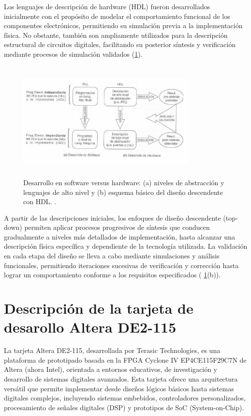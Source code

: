 Los lenguajes de descripción de hardware (HDL) fueron desarrollados inicialmente con el propósito de modelar el comportamiento funcional de los componentes electrónicos, permitiendo su simulación previa a la implementación física. No obstante, también son ampliamente utilizados para la descripción estructural de circuitos digitales, facilitando su posterior síntesis y verificación mediante procesos de simulación validados (\ref{fig:imagen2}).
\begin{figure}[h!] %
    \centering %
     \includegraphics[width=0.8\textwidth, height=6cm]{imagenes/img2} %
    \caption{Desarrollo en software versus hardware: (a) niveles de abstracción y lenguajes de alto nivel y (b) esquema básico del diseño descendente con HDL.  .}
    \label{fig:imagen2} %
\end{figure} 

A partir de las descripciones iniciales, los enfoques de diseño descendente (top-down) permiten aplicar procesos progresivos de síntesis que conducen gradualmente a niveles más detallados de implementación, hasta alcanzar una descripción física específica y dependiente de la tecnología utilizada. La validación en cada etapa del diseño se lleva a cabo mediante simulaciones y análisis funcionales, permitiendo iteraciones sucesivas de verificación y corrección hasta lograr un comportamiento conforme a los requisitos especificados ( \ref{fig:imagen2}(b)).


\section{Descripción de la tarjeta de desarollo Altera DE2-115 }

La tarjeta Altera DE2-115, desarrollada por Terasic Technologies, es una plataforma de prototipado basada en la FPGA Cyclone IV EP4CE115F29C7N de Altera (ahora Intel), orientada a entornos educativos, de investigación y desarrollo de sistemas digitales avanzados. Esta tarjeta ofrece una arquitectura versátil que permite implementar desde diseños lógicos básicos hasta sistemas digitales complejos, incluyendo sistemas embebidos, controladores personalizados, procesamiento de señales digitales (DSP) y prototipos de SoC (System-on-Chip).

